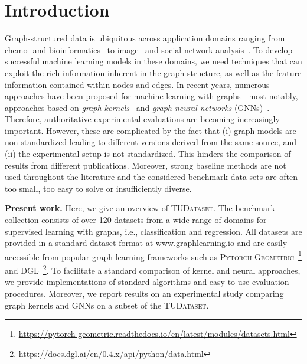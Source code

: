 \documentclass{article}
\newcommand{\xhdr}[1]{{\noindent\bfseries #1}}
\theoremstyle{definition}
\newcommand{\new}[1]{\emph{#1}}
\begin{document}
\section{Introduction}
Graph-structured data is ubiquitous across application domains ranging from chemo- and bioinformatics~\cite{Barabasi2004,Sto+2020} to image~\cite{Sim+2017} and social network analysis~\cite{Eas+2010}. To develop successful machine learning models in these domains, we need techniques that can exploit the rich information inherent in the graph structure, as well as the feature information contained within nodes and edges. In recent years, numerous approaches have been proposed for machine learning with graphs---most notably, approaches based on \new{graph kernels}~\cite{Kri+2019} and \new{graph neural networks} (GNNs)~\cite{Sca+2009,Gil+2017}.
Therefore, authoritative experimental evaluations are becoming increasingly important. However, these are complicated by the fact that (i) graph models are non standardized leading to different versions derived from the same source, and (ii) the experimental setup is not standardized. This hinders the comparison of results from different publications.
Moreover, strong baseline methods are not used throughout the literature and the considered benchmark data sets are often too small, too easy to solve or insufficiently diverse.


\xhdr{Present work.} 
Here, we give an overview of \textsc{TUDataset}. The benchmark collection consists of over 120 datasets from a wide range of domains for supervised learning with graphs, i.e., classification and regression. All datasets are provided in a standard dataset format at \url{www.graphlearning.io} and are easily accessible from popular graph learning frameworks such as \textsc{Pytorch Geometric}~\cite{Fey+2019}\footnote{\url{https://pytorch-geometric.readthedocs.io/en/latest/modules/datasets.html}} and \textsc{DGL}~\cite{Wan+2019}\footnote{\url{https://docs.dgl.ai/en/0.4.x/api/python/data.html}}. To facilitate a standard comparison of kernel and neural approaches, we provide implementations of standard algorithms and easy-to-use evaluation procedures. Moreover, we report results on an experimental study comparing graph kernels and GNNs on a subset of the \textsc{TUDataset}.
\end{document}
